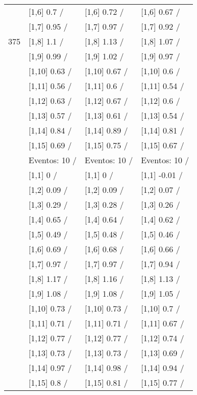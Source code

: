 \begin{table}
\begin{tabular}[t]{llll}
 & {}[1,6] 0.7  / & {}[1,6] 0.72  / & {}[1,6] 0.67  /\\
 & {}[1,7] 0.95  / & {}[1,7] 0.97  / & {}[1,7] 0.92  /\\
375 & {}[1,8] 1.1  / & {}[1,8] 1.13  / & {}[1,8] 1.07  /\\
\addlinespace
 & {}[1,9] 0.99  / & {}[1,9] 1.02  / & {}[1,9] 0.97  /\\
 & {}[1,10] 0.63  / & {}[1,10] 0.67  / & {}[1,10] 0.6  /\\
 & {}[1,11] 0.56  / & {}[1,11] 0.6  / & {}[1,11] 0.54  /\\
 & {}[1,12] 0.63  / & {}[1,12] 0.67  / & {}[1,12] 0.6  /\\
 & {}[1,13] 0.57  / & {}[1,13] 0.61  / & {}[1,13] 0.54  /\\
\addlinespace
 & {}[1,14] 0.84  / & {}[1,14] 0.89  / & {}[1,14] 0.81  /\\
 & {}[1,15] 0.69  / & {}[1,15] 0.75  / & {}[1,15] 0.67  /\\
 & Eventos:  10 / & Eventos:  10 / & Eventos:  10 /\\
 & {}[1,1] 0  / & {}[1,1] 0  / & {}[1,1] -0.01  /\\
 & {}[1,2] 0.09  / & {}[1,2] 0.09  / & {}[1,2] 0.07  /\\
\addlinespace
 & {}[1,3] 0.29  / & {}[1,3] 0.28  / & {}[1,3] 0.26  /\\
 & {}[1,4] 0.65  / & {}[1,4] 0.64  / & {}[1,4] 0.62  /\\
 & {}[1,5] 0.49  / & {}[1,5] 0.48  / & {}[1,5] 0.46  /\\
 & {}[1,6] 0.69  / & {}[1,6] 0.68  / & {}[1,6] 0.66  /\\
 & {}[1,7] 0.97  / & {}[1,7] 0.97  / & {}[1,7] 0.94  /\\
\addlinespace
500 & {}[1,8] 1.17  / & {}[1,8] 1.16  / & {}[1,8] 1.13  /\\
 & {}[1,9] 1.08  / & {}[1,9] 1.08  / & {}[1,9] 1.05  /\\
 & {}[1,10] 0.73  / & {}[1,10] 0.73  / & {}[1,10] 0.7  /\\
 & {}[1,11] 0.71  / & {}[1,11] 0.71  / & {}[1,11] 0.67  /\\
 & {}[1,12] 0.77  / & {}[1,12] 0.77  / & {}[1,12] 0.74  /\\
\addlinespace
 & {}[1,13] 0.73  / & {}[1,13] 0.73  / & {}[1,13] 0.69  /\\
 & {}[1,14] 0.97  / & {}[1,14] 0.98  / & {}[1,14] 0.94  /\\
 & {}[1,15] 0.8  / & {}[1,15] 0.81  / & {}[1,15] 0.77  /\\
\bottomrule
\end{tabular}
\end{table}
